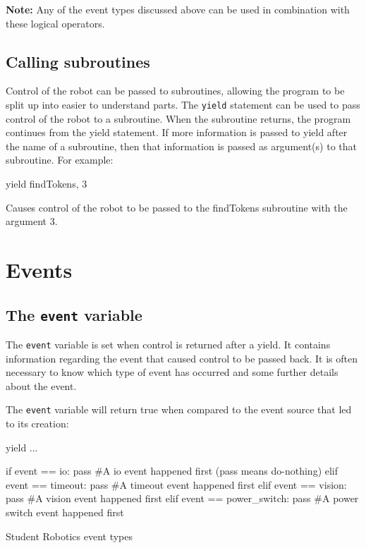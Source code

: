 \documentclass[a4paper, 12pt]{article}
\begin{document}
\noindent\textbf{Note:} Any of the event types discussed above can be used in combination with these logical operators.

\subsection{Calling subroutines}
Control of the robot can be passed to subroutines, allowing the program to be
split up into easier to understand parts.  The \texttt{yield} statement can be
used to pass control of the robot to a subroutine.  When the subroutine returns,
the program continues from the yield statement.  If more information is
passed to yield after the name of a subroutine, then that information is passed
as argument(s) to that subroutine.  For example:

\begin{verbatimtab}
yield findTokens, 3
\end{verbatimtab}

Causes control of the robot to be passed to the findTokens subroutine with the
argument 3.

\section{Events}
\subsection{The \texttt{event} variable}
The \texttt{event} variable is set when control is returned after a
yield. It contains information regarding the event that caused control
to be passed back. It is often necessary to know which type of event has occurred and some further details about the event.
\vspace{12pt}

The \texttt{event} variable will return true when compared to the
event source that led to its creation:

\begin{python}
\begin{verbatimtab}
yield ...

if event == io:
	pass #A io event happened first (pass means do-nothing)
elif event == timeout:
	pass #A timeout event happened first
elif event == vision:
 	pass #A vision event happened first
elif event == power_switch:
	pass #A power switch event happened first
\end{verbatimtab}
\caption{\label{py:events} Student Robotics event types}
\end{python}
\end{document}
